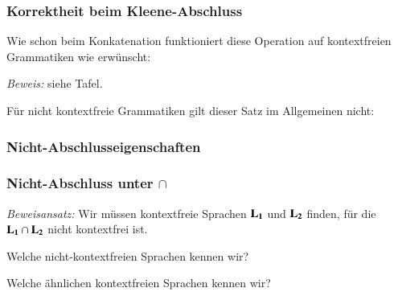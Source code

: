 \documentclass[aspectratio=1610,onlymath]{beamer}
\begin{document}
\begin{frame}\frametitle{Korrektheit beim Kleene-Abschluss}

Wie schon beim Konkatenation funktioniert diese Operation auf kontextfreien Grammatiken wie
erwünscht:


\emph{Beweis:} siehe Tafel.
\medskip\pause

Für nicht kontextfreie Grammatiken gilt dieser Satz im Allgemeinen nicht:


\end{frame}

\begin{frame}\frametitle{Nicht-Abschlusseigenschaften}


\end{frame}

\begin{frame}\frametitle{Nicht-Abschluss unter $\cap$}

\emph{Beweisansatz:} Wir müssen kontextfreie Sprachen $\textbf{\textcolor{black}{L}}_{\textbf{\textcolor{black}{1}}}$ und $\textbf{\textcolor{black}{L}}_{\textbf{\textcolor{black}{2}}}$ finden, für die
$\textbf{\textcolor{black}{L}}_{\textbf{\textcolor{black}{1}}}\cap\textbf{\textcolor{black}{L}}_{\textbf{\textcolor{black}{2}}}$ nicht kontextfrei ist.\medskip

\alert{Welche nicht-kontextfreien Sprachen kennen wir?}\pause
\medskip

\bigskip\pause

\alert{Welche ähnlichen kontextfreien Sprachen kennen wir?}\pause
\medskip


\end{frame}
\end{document}
